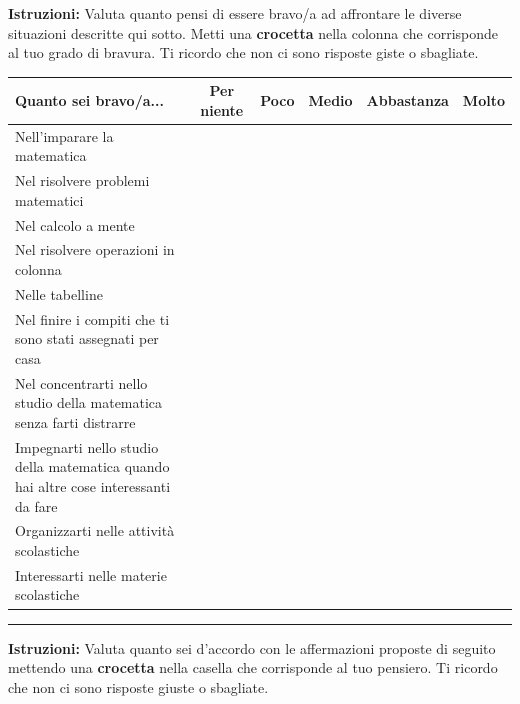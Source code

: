 \documentclass[11pt]{article}
\begin{document}
\newpage

\noindent\textbf{Istruzioni:} Valuta quanto pensi di essere bravo/a ad affrontare le diverse situazioni descritte qui sotto. Metti una \textbf{crocetta} nella colonna che corrisponde al tuo grado di bravura. Ti ricordo che non ci sono risposte giste o sbagliate. 
\newline

\noindent\begin{tabular}{|p{7cm}|c|c|c|c|c|}
  \hline
  \textbf{Quanto sei bravo/a...} & \textbf{Per niente} & \textbf{Poco} & \textbf{Medio} & \textbf{Abbastanza} & \textbf{Molto} \\
  \hline
  Nell'imparare la matematica & & & & & \\
  \hline
  Nel risolvere problemi matematici & & & & & \\
  \hline
  Nel calcolo a mente & & & & & \\
  \hline
  Nel risolvere operazioni in colonna & & & & & \\
  \hline
  Nelle tabelline & & & & & \\
  \hline
  Nel finire i compiti che ti sono stati assegnati per casa & & & & & \\
  \hline 
  Nel concentrarti nello studio della matematica senza farti distrarre & & & & & \\
  \hline
  Impegnarti nello studio della matematica quando hai altre cose interessanti da fare & & & & & \\
  \hline
  Organizzarti nelle attività scolastiche & & & & & \\
  \hline
  Interessarti nelle materie scolastiche & & & & & \\
  \hline
\end{tabular}

\newpage

\medskip\hrule \medskip 
\noindent\textbf{Istruzioni:} Valuta quanto sei d'accordo con le affermazioni proposte di seguito mettendo una \textbf{crocetta} nella casella che corrisponde al tuo pensiero. Ti ricordo che non ci sono risposte giuste o sbagliate. 
\newline
\end{document}
